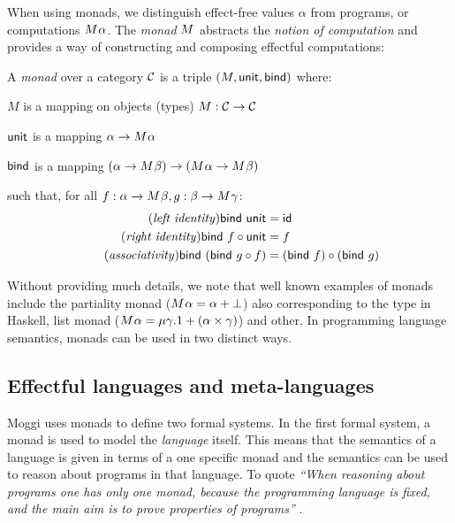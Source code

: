 When using monads, we distinguish effect-free values $\alpha$ from programs, or 
computations $M^{}\alpha$. The \emph{monad} $M^{}$ abstracts the \emph{notion of 
computation} and provides a way of constructing and composing effectful computations:

\begin{definition}
A \emph{monad} over a category $\mathcal{C}$ is a triple $(M, \textnormal{\sffamily unit}, \textnormal{\sffamily bind})$ where:
\begin{compactitem}
\item $M$ is a mapping on objects (types) $M : \mathcal{C} \rightarrow \mathcal{C}$
\item $\textnormal{\sffamily unit}$ is a mapping $\alpha \rightarrow M^{}\alpha$ 
\item $\textnormal{\sffamily bind}$ is a mapping $(\alpha \rightarrow M^{}\beta) 
  \rightarrow (M^{}\alpha \rightarrow M^{}\beta)$
\end{compactitem}
such that, for all $f:\alpha \rightarrow M^{}\beta, g:\beta \rightarrow M^{}\gamma$:
\begin{align}
\tag{\emph{left identity}}
  \ident{bind}~\ident{unit} &= \idf{}
  \\
\tag{\emph{right identity}}
  \ident{bind}~f \circ \ident{unit} &= f
  \\
\tag{\emph{associativity}}
  \ident{bind}~(\ident{bind}~g \circ f) &= (\ident{bind}~f) \circ (\ident{bind}~g)
\end{align}
\end{definition}

\noindent
Without providing much details, we note that well known examples of monads include the partiality
monad ($M^{}\alpha = \alpha + {\bot}$) also corresponding to the  type in 
Haskell, list monad ($M^{}\alpha = \mu \gamma.1 + (\alpha \times \gamma)$) and other.
In programming language semantics, monads can be used in two distinct ways.


\subsection{Effectful languages and meta-languages}

Moggi uses monads to define two formal systems. In the first formal system, a monad is used to model 
the \emph{language} itself. This means that the semantics of a language is given in terms of a 
one specific monad and the semantics can be used to reason about programs in that language. To quote 
\emph{``When reasoning about programs one has only one monad, because the programming language is 
fixed, and the main aim is to prove properties of programs''} \cite[p. 5]{monad-notions}.

